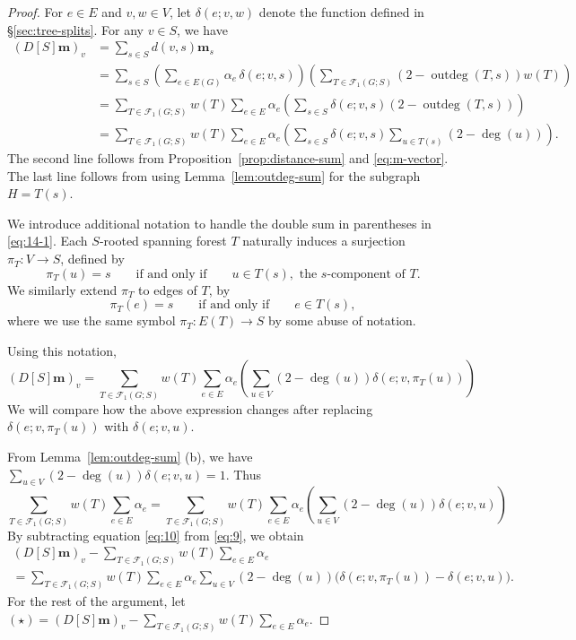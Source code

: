 \documentclass[12pt]{amsart}
\theoremstyle{definition}
\newcommand{\boldm}{\mathbf{m}}
\newcommand{\trees}{\mathcal{F}_1}
\DeclareMathOperator{\outdeg}{outdeg}
\begin{document}
\begin{proof}
For $e\in E$ and $v,w\in V$, let $\delta(e;v,w)$ denote the function defined in \S\ref{sec:tree-splits}.
For any $v \in S$, we have
\begin{align}
  (D[S] \boldm)_v &= \sum_{s \in S} d(v,s) \boldm_s \nonumber \\
  &= \sum_{s \in S} \left( \sum_{e \in E(G)} \alpha_e\, \delta(e; v,s) \right) \left( \sum_{T \in \trees(G;S)} (2 - \outdeg(T,s)) w({T}) \right) \nonumber \\
  &= \sum_{T\in \trees(G;S)} w({T}) \sum_{e\in E} \alpha_e \left( \sum_{s \in S} \delta(e; v,s) (2 - \outdeg(T, s)) \right) \nonumber \\
  &= \sum_{T \in \trees(G;S)} w({T}) \sum_{e \in E} \alpha_e \left( \sum_{s \in S} \delta(e; v,s) \sum_{u \in T(s)} (2 - \deg(u)) \right). \label{eq:14-1}
\end{align}
The second line follows from Proposition~\ref{prop:distance-sum} and \eqref{eq:m-vector}. 
The last line follows from using Lemma~\ref{lem:outdeg-sum} for the subgraph $H = T(s)$.

We introduce additional notation to handle the double sum in parentheses in \eqref{eq:14-1}.
Each $S$-rooted spanning forest $T$ naturally induces a surjection $\pi_T\colon V \to S$, defined by 
\[
	\pi_T(u) = s \qquad\text{if and only if}\qquad u \in T(s), \text{ the $s$-component of $T$}.
\]
We similarly extend $\pi_T$ to edges of $T$, by
\[
	\pi_T(e) = s \qquad\text{if and only if} \qquad e \in T(s),
\]
where we use the same symbol $\pi_T : E(T) \to S$ by some abuse of notation.

Using this notation,
\begin{equation}\label{eq:9}
	(D[S] \boldm)_v = \sum_{T \in \trees(G;S)} w({T}) \sum_{e \in E} \alpha_e \left( \sum_{u \in V} (2 - \deg(u)) \delta(e; v,\pi_T(u)) \right)
\end{equation}
We will compare how the above expression changes after replacing $\delta(e; v,\pi_T(u))$ with $\delta(e; v, u)$.

From Lemma~\ref{lem:outdeg-sum} (b), 
we have
$\displaystyle
	\sum_{u \in V} (2 - \deg(u)) \delta(e; v,u)
	= 1. 
$
Thus
\begin{equation}\label{eq:10}
	\sum_{T \in \trees(G;S)} w({T}) \sum_{e \in E} \alpha_e
	= \sum_{T \in \trees(G;S)} w({T}) \sum_{e \in E} \alpha_e \left( \sum_{u \in V} (2 - \deg(u)) \delta(e; v,u) \right) 
\end{equation}
By subtracting equation \eqref{eq:10} from \eqref{eq:9}, we obtain
\begin{multline}\label{eq:subtract-delta-diff}
	(D[S] \boldm)_v - \sum_{T \in \trees(G;S)} w({T}) \sum_{e \in E} \alpha_e \\
	= \sum_{T \in \trees(G;S)} w({T}) \sum_{e \in E} \alpha_e \sum_{u \in V} (2 - \deg(u)) \Big(\delta(e; v, \pi_T(u)) - \delta(e; v, u) \Big).
\end{multline}
For the rest of the argument, let
$\displaystyle
	(\star) = (D[S] \boldm)_v - \sum_{T \in \trees(G;S)} w({T}) \sum_{e \in E} \alpha_e.
$



\end{proof}
\end{document}
